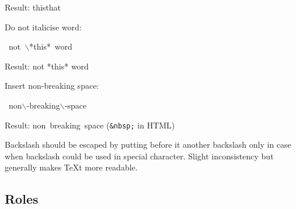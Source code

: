\documentclass[12pt]{article}
\begin{document}
Result: thisthat

Do not italicise word:

\begin{ttfamily}\begin{flushleft}
\mbox{~not~$\backslash$*this*~word}\\
\end{flushleft}\end{ttfamily}

Result: not *this* word

Insert non-breaking space:

\begin{ttfamily}\begin{flushleft}
\mbox{~non$\backslash$-breaking$\backslash$-space}\\
\end{flushleft}\end{ttfamily}

Result: non~breaking~space (\texttt{\&nbsp;} in HTML)

\begin{center}
\end{center}

Backslash should be escaped by putting before it another backslash only in
case when backslash could be used in special character. Slight inconsistency
but generally makes \TeX{}t more readable.

\hypertarget{lroles}{}
\subsection{Roles}
\end{document}
